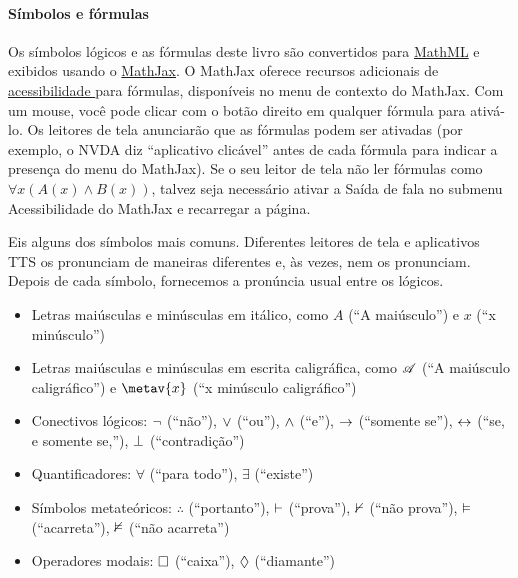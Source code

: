 \paragraph{Símbolos e fórmulas}

Os símbolos lógicos e as fórmulas deste livro são convertidos para
\href{https://www.w3.org/Math/}{MathML} e exibidos usando o
\href{https://www.mathjax.org/}{MathJax}. O MathJax oferece recursos adicionais de
\href{https://docs.mathjax.org/en/latest/basic/accessibility.html}{acessibilidade
} para fórmulas, disponíveis no menu de contexto do MathJax.
Com um mouse, você pode clicar com o botão direito em qualquer fórmula para ativá-lo.
Os leitores de tela anunciarão que as fórmulas podem ser ativadas (por exemplo, o NVDA diz \textquotedblleft aplicativo clicável\textquotedblright{} antes de cada fórmula para indicar a presença do menu do MathJax). Se o seu leitor de tela não ler fórmulas como $\forall x(A(x) \land B(x))$, talvez seja necessário ativar a Saída de fala no submenu Acessibilidade do MathJax e recarregar a página.

Eis alguns dos símbolos mais comuns. Diferentes leitores de tela e aplicativos TTS os pronunciam de maneiras diferentes e, às vezes, nem os pronunciam. Depois de cada símbolo, fornecemos a pronúncia usual entre os lógicos.
\begin{itemize}
  \item Letras maiúsculas e minúsculas em itálico, como $A$ (\textquotedblleft A maiúsculo\textquotedblright{}) e $x$ (\textquotedblleft x minúsculo\textquotedblright{})
  \item Letras maiúsculas e minúsculas em escrita caligráfica, como $\mathscr{A}$ (\textquotedblleft A maiúsculo caligráfico\textquotedblright{}) e $\metav{x}$ (\textquotedblleft x minúsculo caligráfico\textquotedblright{})
  \item Conectivos lógicos: $\neg$ (\textquotedblleft não\textquotedblright{}), $\vee$ (\textquotedblleft ou\textquotedblright{}), $\wedge$ (\textquotedblleft e\textquotedblright{}), $\rightarrow$ (\textquotedblleft somente se\textquotedblright{}), $\leftrightarrow$ (\textquotedblleft se, e somente se,\textquotedblright{}), $\bot$ (\textquotedblleft contradição\textquotedblright{})
  \item Quantificadores: $\forall$ (\textquotedblleft para todo\textquotedblright{}), $\exists$ (\textquotedblleft existe\textquotedblright{})
  \item Símbolos metateóricos: $\therefore$ (\textquotedblleft portanto\textquotedblright{}), $\vdash$ (\textquotedblleft prova\textquotedblright{}), $\nvdash$ (\textquotedblleft não prova\textquotedblright{}), $\vDash$ (\textquotedblleft acarreta\textquotedblright{}), $\nvDash$ (\textquotedblleft não acarreta\textquotedblright{})
  \item Operadores modais: $\Box$ (\textquotedblleft caixa\textquotedblright{}), $\Diamond$ (\textquotedblleft diamante\textquotedblright{})
\end{itemize}

